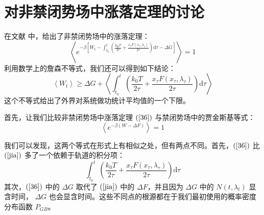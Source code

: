 \section{对非禁闭势场中涨落定理的讨论}
在文献\cite{streissnigWorkFluctuationTheorem2021}
中，给出了非禁闭势场中的涨落定理：
\begin{equation}\label{36}
\left\langle e^{-\beta\left[W_{t}-\int_{t_{0}}^{t}\left(\frac{k_{\mathrm{B}} T}{2 \tau}+\frac{x_{\tau} F\left(x_{\tau}, \lambda_{\tau}\right)}{2 \tau}\right) \mathrm{d} \tau-\Delta G\right]}\right\rangle=1
\end{equation}
利用数学上的詹森不等式，我们还可以得到如下结论：
\begin{equation}\label{37}
\left\langle W_{t}\right\rangle \geqslant \Delta G+\left\langle\int_{t_{0}}^{t}\left(\frac{k_{0} T}{2 \tau}+\frac{x_{\tau} F\left(x_{\tau}, \lambda_{\tau}\right)}{2 \tau}\right) \mathrm{d} \tau\right\rangle
\end{equation}
这个不等式给出了外界对系统做功统计平均值的一个下限。

首先，让我们比较非禁闭势场中涨落定理  $(\ref{36})$  与禁闭势场中的贾金斯基等式：
\begin{equation}\label{jia}
\left\langle e^{-\beta(W-\Delta F)}\right\rangle=1
\end{equation}

我们可以发现，这两个等式在形式上有相似之处，但有两点不同。首先，$(\ref{36})$  比  $(\ref{jia})$  多了一个依赖于轨道的积分项：
\begin{equation}
\int_{t_{0}}^{t}\left(\frac{k_{0} T}{2 \tau}+\frac{x_{\tau} F\left(x_{\tau}, \lambda_{\tau}\right)}{2 \tau}\right) \mathrm{d} \tau
\end{equation}
其次，$(\ref{36})$  中的  $\Delta G$  取代了  $(\ref{jia})$  中的  $\Delta F$，并且因为  $\Delta G$  中的  $N\left(t, \lambda_{t}\right)$  显含时间，  $\Delta G$  也会显含时间。这些不同点的根源都在于我们最初使用的概率密度分布函数  $P_{GB}$。

